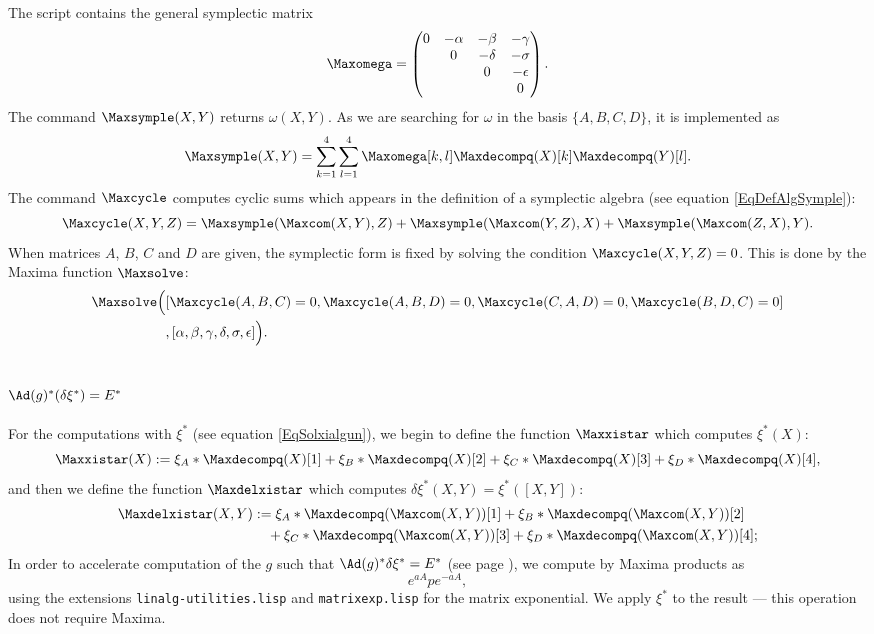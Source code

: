 The script  contains the general symplectic matrix
\[ 
  \Maxomega=\begin{pmatrix}
 0	&	-\alpha	&-\beta&-\gamma\\
&0&-\delta&-\sigma\\
&&0&-\epsilon\\
&&&0
\end{pmatrix}.
\]
The command $\Maxsymple(X,Y)$ returns $\omega(X,Y)$. As we are searching for $\omega$ in the basis $\{ A,B,C,D \}$, it is implemented as
\[ 
  \Maxsymple(X,Y)=\sum_{k=1}^{4}\sum_{l=1}^{4}\Maxomega[k,l]\Maxdecompq(X)[k]\Maxdecompq(Y)[l].
\]
The command $\Maxcycle$ computes cyclic sums which appears in the definition of a symplectic algebra (see equation \eqref{EqDefAlgSymple}): 
\begin{equation}
\Maxcycle(X,Y,Z)=\Maxsymple(\Maxcom(X,Y),Z)+\Maxsymple(\Maxcom(Y,Z),X)+\Maxsymple(\Maxcom(Z,X),Y).
\end{equation}
When matrices $A$, $B$, $C$ and $D$ are given, the symplectic form is fixed by solving the condition $\Maxcycle(X,Y,Z)=0$. This is done by the Maxima function $\Maxsolve$:
\[ 
\begin{split}
\Maxsolve\Big(&  [\Maxcycle(A,B,C)=0,\Maxcycle(A,B,D)=0,\Maxcycle(C,A,D)=0,\Maxcycle(B,D,C)=0]\\
		&,[\alpha,\beta,\gamma,\delta,\sigma,\epsilon] \Big).
\end{split}
\]

\subsection{\texorpdfstring{$\Ad(g)^*(\delta\xi^*)=E^*$}{AdgxiE}}

For the computations with $\xi^*$ (see equation  \ref{EqSolxialgun}), we begin to define the function $\Maxxistar$ which computes $\xi^*(X)$:
\[ 
\Maxxistar(X):=\xi_{A}*\Maxdecompq(X)[1]+\xi_{B}*\Maxdecompq(X)[2]+\xi_{C}*\Maxdecompq(X)[3]+\xi_{D}*\Maxdecompq(X)[4],
\]
and then we define the function $\Maxdelxistar$ which computes $\delta\xi^*(X,Y)=\xi^*([X,Y])$:
\[ 
\begin{split}
\Maxdelxistar(X,Y)&:=\xi_{A}*\Maxdecompq(\Maxcom(X,Y))[1]+\xi_{B}*\Maxdecompq(\Maxcom(X,Y))[2]\\
	&\quad+\xi_{C}*\Maxdecompq(\Maxcom(X,Y))[3]+\xi_{D}*\Maxdecompq(\Maxcom(X,Y))[4];
\end{split}
\]
In order to accelerate computation of  the $g$ such that $\Ad(g)^*\delta\xi^*=E^*$ (see page \pageref{PgAdgXEbbekl}), we compute by Maxima products as
\[ 
   e^{aA}p e^{-aA},
\]
using the extensions \texttt{linalg-utilities.lisp} and \texttt{matrixexp.lisp} for the matrix exponential. We apply $\xi^*$ to the result --- this operation does not require Maxima.

